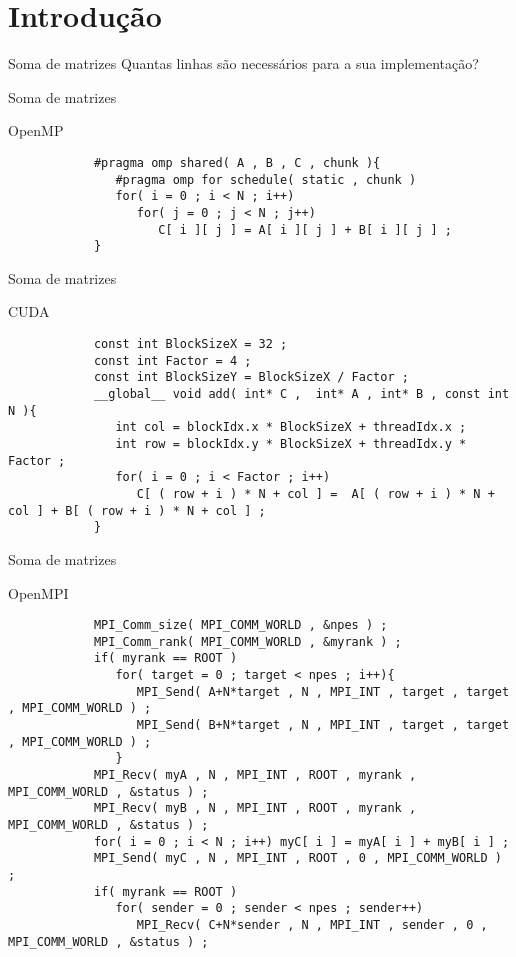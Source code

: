 \section{Introdução}

\begin{frame}{Soma de matrizes}
	\centering
	Quantas linhas são necessários para a sua implementação?
\end{frame}

\begin{frame}[fragile]{Soma de matrizes}
	\begin{block}{OpenMP}
		\begin{lstlisting}
			#pragma omp shared( A , B , C , chunk ){
			   #pragma omp for schedule( static , chunk )
			   for( i = 0 ; i < N ; i++)
			      for( j = 0 ; j < N ; j++)
			         C[ i ][ j ] = A[ i ][ j ] + B[ i ][ j ] ;
			}
		\end{lstlisting}
	\end{block}
\end{frame}

\begin{frame}[fragile]{Soma de matrizes}
	\begin{block}{CUDA}
		\begin{lstlisting}
			const int BlockSizeX = 32 ;
			const int Factor = 4 ;
			const int BlockSizeY = BlockSizeX / Factor ;
			__global__ void add( int* C ,  int* A , int* B , const int N ){
			   int col = blockIdx.x * BlockSizeX + threadIdx.x ;
			   int row = blockIdx.y * BlockSizeX + threadIdx.y * Factor ;
			   for( i = 0 ; i < Factor ; i++)
			      C[ ( row + i ) * N + col ] =  A[ ( row + i ) * N + col ] + B[ ( row + i ) * N + col ] ;
			}
		\end{lstlisting}
	\end{block}
\end{frame}

\begin{frame}[fragile]{Soma de matrizes}
	\begin{block}{OpenMPI}
		\begin{lstlisting}
			MPI_Comm_size( MPI_COMM_WORLD , &npes ) ;
			MPI_Comm_rank( MPI_COMM_WORLD , &myrank ) ;
			if( myrank == ROOT )
			   for( target = 0 ; target < npes ; i++){
			      MPI_Send( A+N*target , N , MPI_INT , target , target , MPI_COMM_WORLD ) ;
			      MPI_Send( B+N*target , N , MPI_INT , target , target , MPI_COMM_WORLD ) ;
			   }
			MPI_Recv( myA , N , MPI_INT , ROOT , myrank , MPI_COMM_WORLD , &status ) ;
			MPI_Recv( myB , N , MPI_INT , ROOT , myrank , MPI_COMM_WORLD , &status ) ;
			for( i = 0 ; i < N ; i++) myC[ i ] = myA[ i ] + myB[ i ] ;
			MPI_Send( myC , N , MPI_INT , ROOT , 0 , MPI_COMM_WORLD ) ;
			if( myrank == ROOT )
			   for( sender = 0 ; sender < npes ; sender++)
			      MPI_Recv( C+N*sender , N , MPI_INT , sender , 0 , MPI_COMM_WORLD , &status ) ;
		\end{lstlisting}
	\end{block}
\end{frame}


